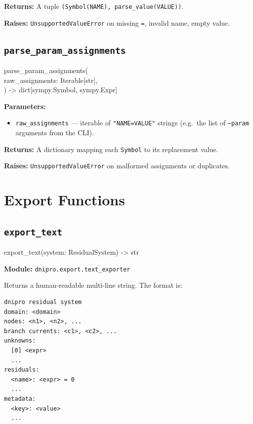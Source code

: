 \documentclass[11pt,a4paper]{article}
\newcommand{\code}[1]{\texttt{#1}}
\newenvironment{apisig}{%
  \begin{trivlist}\item\relax\ttfamily\small
}{%
  \end{trivlist}
}
\begin{document}
\textbf{Returns:} A tuple \code{(Symbol(NAME), parse\_value(VALUE))}.

\textbf{Raises:} \code{UnsupportedValueError} on missing \code{=},
invalid name, empty value.

\subsection{\texttt{parse\_param\_assignments}}
\label{api:parse_param_assignments}

\begin{apisig}
parse\_param\_assignments( \\
\quad raw\_assignments: Iterable[str], \\
) -> dict[sympy.Symbol, sympy.Expr]
\end{apisig}

\textbf{Parameters:}
\begin{itemize}[noitemsep]
    \item \code{raw\_assignments} --- iterable of \code{"NAME=VALUE"} strings
          (e.g.\ the list of \code{--param} arguments from the CLI).
\end{itemize}

\textbf{Returns:} A dictionary mapping each \code{Symbol} to its replacement value.

\textbf{Raises:} \code{UnsupportedValueError} on malformed assignments or duplicates.

\section{Export Functions}
\label{sec:api-export}

\subsection{\texttt{export\_text}}
\label{api:export_text}

\begin{apisig}
export\_text(system: ResidualSystem) -> str
\end{apisig}

\textbf{Module:} \code{dnipro.export.text\_exporter}

Returns a human-readable multi-line string.
The format is:

\begin{lstlisting}
dnipro residual system
domain: <domain>
nodes: <n1>, <n2>, ...
branch currents: <c1>, <c2>, ...
unknowns:
  [0] <expr>
  ...
residuals:
  <name>: <expr> = 0
  ...
metadata:
  <key>: <value>
  ...
\end{lstlisting}
\end{document}
